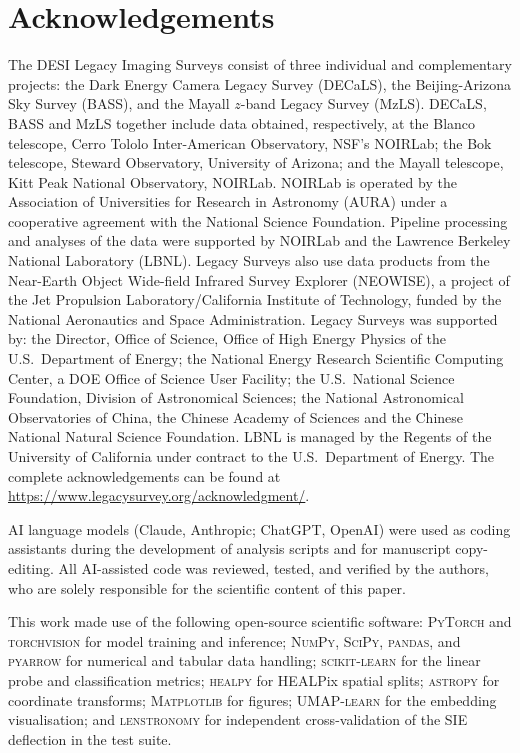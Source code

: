 \documentclass[fleqn,usenatbib]{rasti}
\begin{document}
\section*{Acknowledgements}
The DESI Legacy Imaging Surveys consist of three individual and
complementary projects: the Dark Energy Camera Legacy Survey (DECaLS),
the Beijing-Arizona Sky Survey (BASS), and the Mayall $z$-band Legacy
Survey (MzLS).  DECaLS, BASS and MzLS together include data obtained,
respectively, at the Blanco telescope, Cerro Tololo Inter-American
Observatory, NSF's NOIRLab; the Bok telescope, Steward Observatory,
University of Arizona; and the Mayall telescope, Kitt Peak National
Observatory, NOIRLab.  NOIRLab is operated by the Association of
Universities for Research in Astronomy (AURA) under a cooperative
agreement with the National Science Foundation.  Pipeline processing and
analyses of the data were supported by NOIRLab and the Lawrence Berkeley
National Laboratory (LBNL).  Legacy Surveys also use data products from
the Near-Earth Object Wide-field Infrared Survey Explorer (NEOWISE), a
project of the Jet Propulsion Laboratory/California Institute of
Technology, funded by the National Aeronautics and Space Administration.
Legacy Surveys was supported by: the Director, Office of Science, Office
of High Energy Physics of the U.S.\ Department of Energy; the National
Energy Research Scientific Computing Center, a DOE Office of Science
User Facility; the U.S.\ National Science Foundation, Division of
Astronomical Sciences; the National Astronomical Observatories of China,
the Chinese Academy of Sciences and the Chinese National Natural Science
Foundation.  LBNL is managed by the Regents of the University of
California under contract to the U.S.\ Department of Energy.  The
complete acknowledgements can be found at
\url{https://www.legacysurvey.org/acknowledgment/}.

AI language models (Claude, Anthropic; ChatGPT, OpenAI) were used as
coding assistants during the development of analysis scripts and for
manuscript copy-editing.  All AI-assisted code was reviewed, tested, and
verified by the authors, who are solely responsible for the scientific
content of this paper.

This work made use of the following open-source scientific software:
\textsc{PyTorch} and \textsc{torchvision} for model training and inference;
\textsc{NumPy}, \textsc{SciPy}, \textsc{pandas}, and \textsc{pyarrow} for
numerical and tabular data handling; \textsc{scikit-learn} for the linear
probe and classification metrics; \textsc{healpy} for HEALPix spatial
splits; \textsc{astropy} for coordinate transforms; \textsc{Matplotlib}
for figures; \textsc{UMAP-learn} for the embedding visualisation; and
\textsc{lenstronomy} for independent cross-validation of the SIE
deflection in the test suite.
\end{document}
